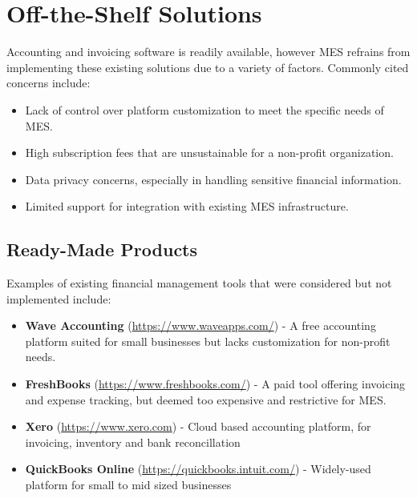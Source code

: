 \documentclass[12pt]{article}
\begin{document}
\section{Off-the-Shelf Solutions}

Accounting and invoicing software is readily available, however MES refrains from implementing these existing solutions due to a variety of factors. Commonly cited concerns include:
\begin{itemize}
    \item Lack of control over platform customization to meet the specific needs of MES.
    \item High subscription fees that are unsustainable for a non-profit organization.
    \item Data privacy concerns, especially in handling sensitive financial information.
    \item Limited support for integration with existing MES infrastructure.
\end{itemize}



\subsection{Ready-Made Products}

Examples of existing financial management tools that were considered but not implemented include:
\begin{itemize}
    \item \textbf{Wave Accounting} (\href{https://www.waveapps.com/}{https://www.waveapps.com/}) - A free accounting platform suited for small businesses but lacks customization for non-profit needs.
    \item \textbf{FreshBooks} (\href{https://www.freshbooks.com/}{https://www.freshbooks.com/}) - A paid tool offering invoicing and expense tracking, but deemed too expensive and restrictive for MES.
    \item \textbf{Xero} (\href{https://www.xero.com}{https://www.xero.com}) - Cloud based accounting platform, for invoicing, inventory and bank reconcillation
    \item \textbf{QuickBooks Online} (\href{https://quickbooks.intuit.com/}{https://quickbooks.intuit.com/}) - Widely-used platform for small to mid sized businesses

\end{itemize}
\end{document}
